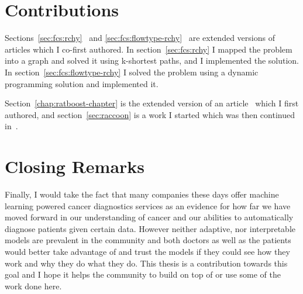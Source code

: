 \section{Contributions}
Sections~\ref{sec:fcs:rchy}~\cite{Aghaeepour2012a} and
\ref{sec:fcs:flowtype-rchy}~\cite{o2014enhanced} are extended versions of
articles which I co-first authored. In section~\ref{sec:fcs:rchy} I mapped
the problem into a graph and solved it using k-shortest paths, and I
implemented the solution. In section~\ref{sec:fcs:flowtype-rchy} I solved the
problem using a dynamic programming solution and implemented it.

Section~\ref{chap:ratboost-chapter} is the extended version of an
article~\cite{jalali2016interpretable} which I first authored, and
section~\ref{sec:raccoon} is a work I started which was then continued
in~\cite{handl2019weighted}.


\section{Closing Remarks}
Finally, I would take the fact that many companies these days offer machine
learning powered cancer diagnostics services as an evidence for how far we have
moved forward in our understanding of cancer and our abilities to automatically
diagnose patients given certain data. However neither adaptive, nor
interpretable models are prevalent in the community and both doctors as well as
the patients would better take advantage of and trust the models if they could
see how they work and why they do what they do. This thesis is a contribution
towards this goal and I hope it helps the community to build on top of or use
some of the work done here.
